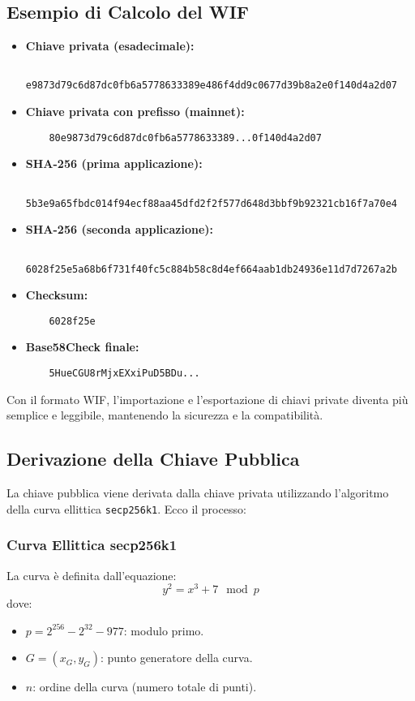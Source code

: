 \documentclass[a4paper,12pt]{article}
\begin{document}
\subsection{Esempio di Calcolo del WIF}
\begin{itemize}
    \item \textbf{Chiave privata (esadecimale):}
    \begin{verbatim}
    e9873d79c6d87dc0fb6a5778633389e486f4dd9c0677d39b8a2e0f140d4a2d07
    \end{verbatim}
    \item \textbf{Chiave privata con prefisso (mainnet):}
    \begin{verbatim}
    80e9873d79c6d87dc0fb6a5778633389...0f140d4a2d07
    \end{verbatim}
    \item \textbf{SHA-256 (prima applicazione):}
    \begin{verbatim}
    5b3e9a65fbdc014f94ecf88aa45dfd2f2f577d648d3bbf9b92321cb16f7a70e4
    \end{verbatim}
    \item \textbf{SHA-256 (seconda applicazione):}
    \begin{verbatim}
    6028f25e5a68b6f731f40fc5c884b58c8d4ef664aab1db24936e11d7d7267a2b
    \end{verbatim}
    \item \textbf{Checksum:}
    \begin{verbatim}
    6028f25e
    \end{verbatim}
    \item \textbf{Base58Check finale:}
    \begin{verbatim}
    5HueCGU8rMjxEXxiPuD5BDu...
    \end{verbatim}
\end{itemize}

Con il formato WIF, l'importazione e l'esportazione di chiavi private diventa più semplice e leggibile, mantenendo la sicurezza e la compatibilità.


\subsection{Derivazione della Chiave Pubblica}
La chiave pubblica viene derivata dalla chiave privata utilizzando l'algoritmo della curva ellittica \texttt{secp256k1}. Ecco il processo:

\subsubsection*{Curva Ellittica secp256k1}
La curva è definita dall'equazione:
\[
y^2 = x^3 + 7 \mod p
\]
dove:
\begin{itemize}
    \item \(p = 2^{256} - 2^{32} - 977\): modulo primo.
    \item \(G = (x_G, y_G)\): punto generatore della curva.
    \item \(n\): ordine della curva (numero totale di punti).
\end{itemize}
\end{document}
